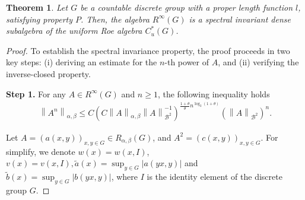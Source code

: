 \documentclass[preprint,11pt]{elsarticle}
\newtheorem{theorem}{Theorem}[section]
\numberwithin{equation}{section}
\begin{document}
	\begin{theorem}\label{spectral subgrow}
		Let $G$ be a countable discrete group with a proper length function $l$, satisfying  property $P$. Then, the  algebra $ R^{\infty }(G)$ is a spectral invariant dense subalgebra of the uniform Roe algebra $C_{u}^{*}(G)$.
	\end{theorem}
	\begin{proof}
		To establish the spectral invariance property, the proof proceeds in two key steps: (i) deriving an estimate for the 
		$n$-th power of $A$, and (ii) verifying the inverse-closed property.
		
		\textbf{Step 1.} For any $A\in R^{\infty}(G)$ and $n\ge 1$, the following  inequality holds
		\begin{align}\label{estim}
			\left \| A^{n} \right \|_{\alpha,\beta } \le C\left ( C\left \| A \right \|_{\alpha,\beta }\left \| A \right \|_{\mathcal{B} ^{2}}^{-1}   \right )^{\frac{1+\theta }{\theta }n^{\log_{2}{(1+\theta )} } } (\left \| A \right \|_{\mathcal{B} ^{2}})^{n}.
		\end{align}
		
		\noindent 
		Let $A=(a(x,y))_{x,y\in G}\in R_{\alpha,\beta}(G)$, and $A^2=(c(x,y))_{x,y\in G}$. For simplify, we denote
		$ w(x)=w(x,I )$, $v(x)=v(x,I ),\tilde{a}(x)=\sup_{y\in G } 
		\left | a(yx,y) \right |$ and $\tilde b(x)=\sup_{y\in G}\left | b(yx,y) \right |$, where $I$ is the identity element of the discrete group $G$.
		

\end{proof}
\end{document}
